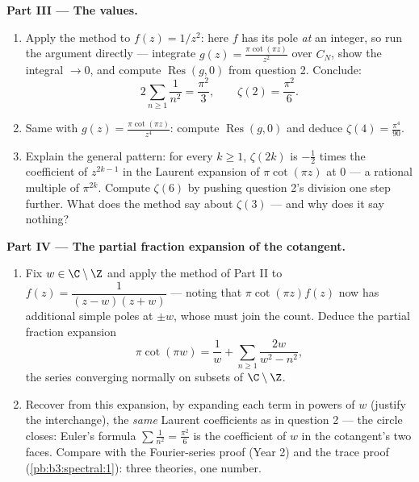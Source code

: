 \begin{problem}
\medskip
\noindent\textbf{Part III --- The values.}
\begin{enumerate}[resume]
  \item Apply the method to $f(z) = 1/z^2$: here $f$ has its
        pole \emph{at} an integer, so run the argument
        directly --- integrate $g(z) = \frac{\pi\cot(\pi
        z)}{z^2}$ over $C_N$, show the integral $\to 0$, and
        compute $\operatorname{Res}(g, 0)$ from question 2.
        Conclude:
        \[
        2\sum_{n\geq1}\frac1{n^2} = \frac{\pi^2}{3},
        \qquad \zeta(2) = \frac{\pi^2}6 .
        \]
  \item Same with $g(z) = \frac{\pi\cot(\pi z)}{z^4}$:
        compute $\operatorname{Res}(g, 0)$ and deduce
        $\zeta(4) = \frac{\pi^4}{90}$.
  \item Explain the general pattern: for every $k \geq 1$,
        $\zeta(2k)$ is $-\frac12$ times the coefficient of
        $z^{2k-1}$ in the Laurent expansion of $\pi\cot(\pi
        z)$ at $0$ --- a rational multiple of $\pi^{2k}$.
        Compute $\zeta(6)$ by pushing question 2's division
        one step further. What does the method say about
        $\zeta(3)$ --- and why does it say nothing?
\end{enumerate}

\medskip
\noindent\textbf{Part IV --- The partial fraction expansion
of the cotangent.}
\begin{enumerate}[resume]
  \item Fix $w \in \C\setminus\Z$ and apply the method of
        Part II to $f(z) = \dfrac{1}{(z - w)(z + w)}$ ---
        noting that $\pi\cot(\pi z)f(z)$ now has additional
        simple poles at $\pm w$, whose  must join the
        count. Deduce the partial fraction expansion
        \[
        \pi\cot(\pi w) = \frac1w +
        \sum_{n\geq1}\frac{2w}{w^2 - n^2},
        \]
        the series converging normally on  subsets of
        $\C\setminus\Z$.
  \item Recover from this expansion, by expanding each term
        in powers of $w$ (justify the interchange), the
        \emph{same} Laurent coefficients as in question 2 ---
        the circle closes: Euler's formula
        $\sum\frac1{n^2} = \frac{\pi^2}6$ is the coefficient
        of $w$ in the cotangent's two faces. Compare with the
        Fourier-series proof (Year 2) and the trace proof
        (\cref{pb:b3:spectral:1}): three theories, one
        number.
\end{enumerate}


\end{problem}
